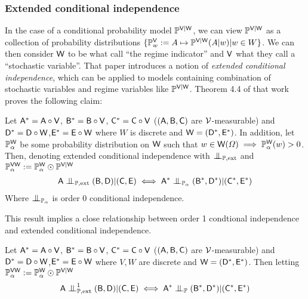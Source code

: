 \subsubsection{Extended conditional independence}

In the case of a conditional probability model $\mathbb{P}^{\mathsf{V}|\mathsf{W}}$, we can view $\mathbb{P}^{\mathsf{V}|\mathsf{W}}$ as a collection of probability distributions $\{\mathbb{P}^{\mathsf{V}}_w:=A\mapsto \mathbb{P}^{\mathsf{V}|\mathsf{W}}(A|w)|w\in W\}$. We can then consider $\mathsf{W}$ to be what \citet{constantinou_extended_2017} call ``the regime indicator'' and $\mathsf{V}$ what they call a ``stochastic variable''. That paper introduces a notion of \emph{extended conditional independence}, which can be applied to models containing combination of stochastic variables and regime variables like $\mathbb{P}^{\mathsf{V}|\mathsf{W}}$.  Theorem 4.4 of that work proves the following claim:

\begin{theorem}\label{th:dawid_constantionou}
Let $\mathsf{A}^*=\mathsf{A}\circ \mathsf{V}$, $\mathsf{B}^*=\mathsf{B}\circ\mathsf{V}$, $\mathsf{C}^*=\mathsf{C}\circ \mathsf{V}$ ($(\mathsf{A},\mathsf{B},\mathsf{C})$ are $\mathcal{V}$-measurable) and $\mathsf{D}^*=\mathsf{D}\circ \mathsf{W}$,$\mathsf{E}^*=\mathsf{E}\circ \mathsf{W}$ where $W$ is discrete and $\mathsf{W}=(\mathsf{D}^*,\mathsf{E}^*)$. In addition, let $\mathbb{P}_\alpha^{\mathsf{W}}$ be some probability distribution on $\mathsf{W}$ such that $w\in\mathsf{W}(\Omega)\implies \mathbb{P}_\alpha^{\mathsf{W}}(w)>0$. Then, denoting extended conditional independence with $\CI_{\prob{P},\text{ext}}$ and $\mathbb{P}_\alpha^{\mathsf{VW}}:=\mathbb{P}_\alpha^{\mathsf{W}}\odot \mathbb{P}^{\mathsf{V}|\mathsf{W}}$
\begin{align}
	\RV{A}\CI_{\prob{P},\text{ext}}(\RV{B},\RV{D})|(\RV{C},\RV{E})\iff \RV{A}^*\CI_{\prob{P}_\alpha}(\RV{B}^*,\RV{D}^*)|(\RV{C}^*,\RV{E}^*)
\end{align}
Where $\CI_{\prob{P}_\alpha}$ is order 0 conditional independence.
\end{theorem}

This result implies a close relationship between order 1 condtional independence and extended conditional independence.

\begin{theorem}
Let $\mathsf{A}^*=\mathsf{A}\circ \mathsf{V}$, $\mathsf{B}^*=\mathsf{B}\circ\mathsf{V}$, $\mathsf{C}^*=\mathsf{C}\circ \mathsf{V}$ ($(\mathsf{A},\mathsf{B},\mathsf{C})$ are $\mathcal{V}$-measurable) and $\mathsf{D}^*=\mathsf{D}\circ \mathsf{W}$,$\mathsf{E}^*=\mathsf{E}\circ \mathsf{W}$ where $V,W$ are discrete and $\mathsf{W}=(\mathsf{D}^*,\mathsf{E}^*)$. Then letting $\mathbb{P}_\alpha^{\mathsf{VW}}:=\mathbb{P}_\alpha^{\mathsf{W}}\odot \mathbb{P}^{\mathsf{V}|\mathsf{W}}$
\begin{align}
	\RV{A}\CI^1_{\prob{P},\text{ext}}(\RV{B},\RV{D})|(\RV{C},\RV{E})\iff \RV{A}^*\CI_{\prob{P}}(\RV{B}^*,\RV{D}^*)|(\RV{C}^*,\RV{E}^*)
\end{align}
\end{theorem}

